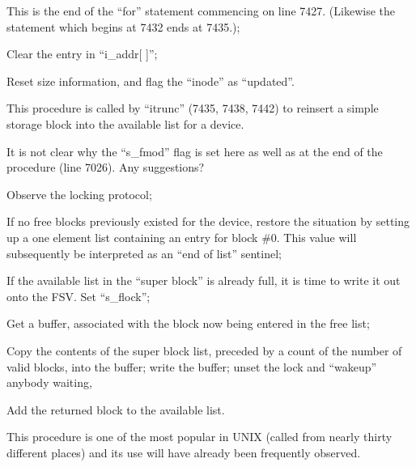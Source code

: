 \item[7439:] This is  the  end  of  the  ``for''
      statement   commencing   on  line
      7427.   (Likewise  the  statement
      which  begins  at  7432  ends  at
      7435.);


\item[7443:] Clear the entry in ``i\_addr[ ]'';


\item[7445:] Reset size information, and  flag
      the ``inode'' as ``updated''.
\ed





This procedure is  called  by  ``itrunc''
(7435, 7438, 7442) to reinsert a simple
storage block into the  available  list
for a device.

\bd
\item[7005:] It is not clear why the ``s\_fmod'' flag
is set here as well as at the end of  the  procedure  (line
7026). Any suggestions?

\item[7006:] Observe the locking protocol;


\item[7010:] If  no  free  blocks   previously
      existed  for  the device, restore
      the situation by setting up a one
      element  list containing an entry
      for block \#0.   This  value  will
      subsequently be interpreted as an
      ``end of list'' sentinel;

\item[7014:] If  the  available  list  in  the
      ``super block'' is already full, it
      is time to write it out onto  the
      FSV. Set ``s\_flock'';


\item[7016:] Get a buffer, associated with the
      block  now  being  entered in the
	free list;

\item[7019:] Copy the contents  of  the  super
      block  list,  preceded by a count
      of the number  of  valid  blocks,
      into   the   buffer;   write  the
      buffer;  unset   the   lock   and
      ``wakeup'' anybody waiting,


\item[7025:] Add the  returned  block  to  the
      available list.
\ed




This procedure is one of the most popular  in UNIX (called from nearly thirty
different places) and its use will have
already been frequently observed.



